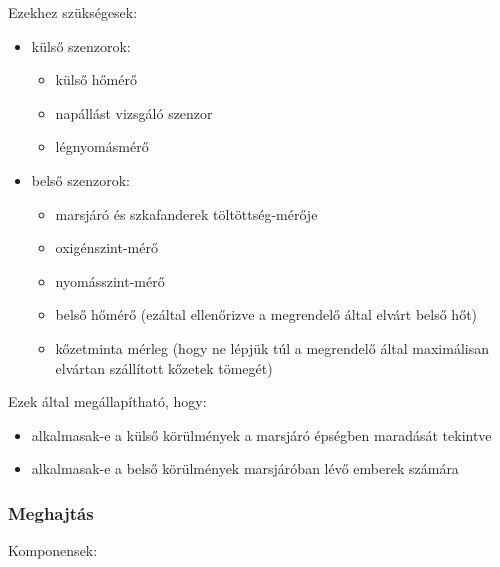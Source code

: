 \documentclass[12pt]{report}
\begin{document}
Ezekhez szükségesek:
\begin{itemize}
  \item külső szenzorok: \begin{itemize}
      \item {} külső hőmérő
      \item {} napállást vizsgáló szenzor
      \item {} légnyomásmérő
    \end{itemize}
  \item belső szenzorok: \begin{itemize}
      \item {} marsjáró és szkafanderek töltöttség-mérője
      \item {} oxigénszint-mérő
      \item {} nyomásszint-mérő
      \item {} belső hőmérő (ezáltal ellenőrizve a megrendelő által elvárt belső hőt)
      \item {} kőzetminta mérleg (hogy ne lépjük túl a megrendelő által maximálisan elvártan szállított kőzetek tömegét)
    \end{itemize}
\end{itemize}

Ezek által megállapítható, hogy:
\begin{itemize}
  \item alkalmasak-e a külső körülmények a marsjáró épségben maradását tekintve
  \item alkalmasak-e a belső körülmények marsjáróban lévő emberek számára
\end{itemize}

\subsubsection{Meghajtás \label{drive}}

Komponensek:
\end{document}
